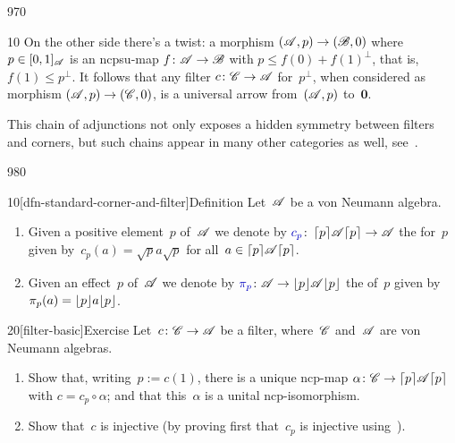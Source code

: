 \begin{parsec}{970}
\begin{point}{10}
On the other side there's a twist:
a morphism $(\mathscr{A},p)\to(\mathscr{B},0)$ where~$p\in[0,1]_{\mathscr{A}}$
is an ncpsu-map $f\colon \mathscr{A}\to\mathscr{B}$
with $p\leq f(0)+f(1)^\perp$,
that is, $f(1)\leq p^\perp$.
It follows that any filter $c\colon \mathscr{C}\to \mathscr{A}$ for~$p^\perp$,
when considered as morphism $(\mathscr{A},p)\to (\mathscr{C},0)$,
is a universal arrow from~$(\mathscr{A},p)$ to~$\mathbf{0}$.

This chain of adjunctions not only exposes
a hidden symmetry between filters and corners,
but such chains appear
in many other categories as well, see~\cite{cho2015quotient}.
\end{point}
\end{parsec}
\begin{parsec}{980}%
\begin{point}{10}[dfn-standard-corner-and-filter]{Definition}%
Let~$\mathscr{A}$ be a von Neumann algebra.
\begin{enumerate}
\item
Given a positive element~$p$
of~$\mathscr{A}$
we denote
by $\Define{c_p}\colon \ceil{p}\!\scrA\!\ceil{p}\to\scrA$%
the %
for~$p$
given by~$c_p(a)=\sqrt{p}a\sqrt{p}$
for all~$a\in\left\lceil p\right\rceil\!\mathscr{A}\!\left\lceil p\right\rceil$.
\item
Given an effect~$p$ of~$\mathscr{A}$
we denote
by $\Define{\pi_p}\colon \scrA\to\floor{p}\!\scrA\!\floor{p}$%
the %
		of~$p$
given by~$\pi_p(a)=\left\lfloor p\right\rfloor\!a\!\left\lfloor p\right\rfloor$.
\end{enumerate}
\spacingfix%
\end{point}%
\begin{point}{20}[filter-basic]{Exercise}%
Let~$c\colon \mathscr{C}\to\mathscr{A}$ be a filter,
where~$\mathscr{C}$ and~$\mathscr{A}$ are von Neumann algebras.
\begin{enumerate}
\item
Show that, writing~$p:=c(1)$,
there is a unique
ncp-map $\alpha \colon \mathscr{C}\to \left\lceil p\right\rceil\!\mathscr{A}\!\left\lceil p\right\rceil$
with $c = c_p \circ \alpha$;
and that this~$\alpha$ is a unital ncp-isomorphism.
\item
Show that~$c$ is injective
(by proving first that~$c_p$ is injective
using~).


\end{enumerate}
\end{point}
\end{parsec}
